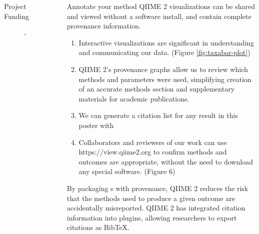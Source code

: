 \documentclass[final]{beamer}
\newlength{\sepwidth}
\newlength{\colwidth}
\newcommand{\separatorcolumn}{\begin{column}{\sepwidth}\end{column}}
\begin{document}
\begin{frame}[t]
\begin{columns}[t]
\begin{column}{\colwidth}
\begin{block}{Project Funding}
\begin{figure}[!htb]
          \begin{center}
            \includegraphics[width=.50\linewidth]{assets/SponsorLogos/NSF}
          \end{center}
        \endminipage\hfill
      \end{figure}
  \end{block}
\end{column}

\separatorcolumn

\begin{column}{\colwidth}

    \begin{block}{Annotate your method}
      QIIME 2 visualizations can be shared and viewed without a software
      install, and contain complete provenance information.

      \begin{enumerate}
        \item Interactive visualizations are significant in understanding and
        communicating our data. (Figure \ref{fig:taxabar-plot})
        \item QIIME 2's provenance graphs allow us to review which methods and
        parameters were used, simplifying creation of an accurate methods section
        and supplementary materials for academic publications.
        \item We can generate a citation list for any result in this poster with 
        \item Collaborators and reviewers of our work can use https://view.qiime2.org to confirm methods and outcomes are
        appropriate, without the need to download any special software. (Figure 6)
      \end{enumerate}

    \begin{tcolorbox}
    [width=\textwidth, colframe=blue]
    {By packaging s with provenance, QIIME 2 reduces the risk that the
    methods used to produce a given outcome are accidentally misreported.
    QIIME 2 has integrated citation information into plugins, allowing
    researchers to export citations as BibTeX}.
    \end{tcolorbox}



\end{block}
\end{column}
\end{columns}
\end{frame}
\end{document}
